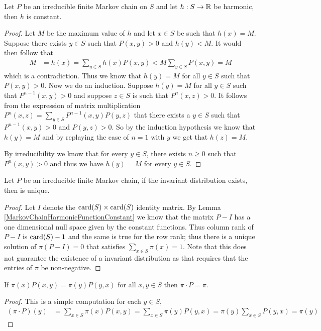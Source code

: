 \begin{lem}\label{MarkovChainHarmonicFunctionConstant}Let $P$ be an irreducible finite Markov chain on $S$ and let $h :
  S \to \mathbb{R}$ be harmonic, then $h$ is constant.
\end{lem}
\begin{proof}
Let $M$ be the maximum value of $h$ and let $x \in S$ be such that
$h(x) = M$.  Suppose there exists $y \in S$ such that $P(x,y) > 0$ and
$h(y) < M$.  It would then follow that
\begin{align*}
M &= h(x) = \sum_{y \in S} h(x) P(x,y) < M \sum_{y \in S} P(x,y) = M
\end{align*}
which is a contradiction.  Thus we know that $h(y) = M$ for all $y \in
S$ such that $P(x,y) > 0$.  Now we do an induction.  Suppose $h(y) =
M$ for all $y \in S$ such that $P^{n-1}(x, y) > 0$ and suppose $z \in
S$ is such that $P^n(x,z) > 0$.  It follows from the expression of
matrix multiplication $P^n(x,z) = \sum_{y \in S} P^{n-1}(x,y) P(y,z)$
that there exists a $y \in S$ such that $P^{n-1}(x,y) > 0$ and $P(y,z)
> 0$.  So by the induction hypothesis we know that $h(y) = M$ and by
replaying the case of $n=1$ with $y$ we get that $h(z) = M$.  

By irreducibility we know that for every $y \in S$, there exists $n
\geq 0$ such that $P^n(x,y) > 0$ and thus we have
$h(y) = M$  for every $y \in S$.
\end{proof}

\begin{lem}Let $P$ be an irreducible finite Markov chain, if the
  invariant distribution exists, then is unique.
\end{lem}
\begin{proof}
Let $I$ denote the $\operatorname*{card}(S) \times \operatorname*{card}(S)$ identity matrix.
By Lemma \ref{MarkovChainHarmonicFunctionConstant} we know that the
matrix $P -I$ has a one dimensional null space given by the constant
functions.  Thus column rank of $P - I$ is $\operatorname*{card}(S) - 1$ and the same
is true for the row rank; thus there is a unique solution of $\pi (P
-I) = 0$ that satisfies $\sum_{x \in S} \pi(x) = 1$.  Note that this
does not guarantee the existence of a invariant distribution as that
requires that the entries of $\pi$ be non-negative.
\end{proof}

\begin{lem}\label{DetailBalanceEquationImpliesInvariance}If $\pi(x) P(x,y) = \pi(y) P(y,x)$ for all $x,y \in S$ then
  $\pi \cdot P = \pi$.
\end{lem}
\begin{proof}
This is a simple computation for each $y \in S$,
\begin{align*}
(\pi \cdot P)(y) &=\sum_{x \in S} \pi(x) P (x,y)  = \sum_{x \in S} \pi(y) P(y,x) =
\pi(y) \sum_{x \in S} P(y,x) = \pi(y)
\end{align*}
\end{proof}


